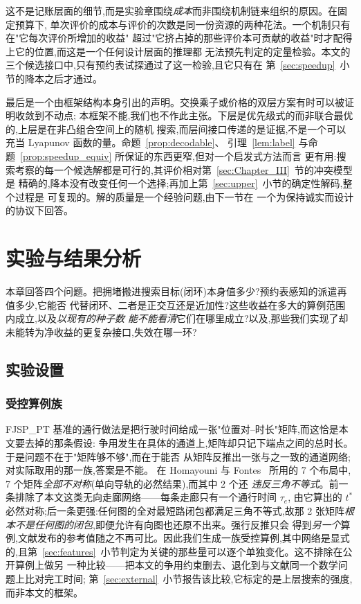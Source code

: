 \documentclass[manuscript,screen,review]{acmart}
\newcommand{\PubNLayout}{7}
\newcommand{\PubNLayoutAsym}{7}           %
\newcommand{\PubNLayoutBad}{2}            %
\begin{document}
这不是记账层面的细节,而是实验章围绕\emph{成本}而非围绕机制链来组织的原因。在固定预算下,
单次评价的成本与评价的次数是同一份资源的两种花法。一个机制只有在"它每次评价所增加的收益"
超过"它挤占掉的那些评价本可贡献的收益"时才配得上它的位置,而这是一个任何设计层面的推理都
无法预先判定的定量检验。本文的三个候选接口中,只有预约表试探通过了这一检验,且它只有在
第~\ref{sec:speedup}~小节的降本之后才通过。

最后是一个由框架结构本身引出的声明。交换乘子或价格的双层方案有时可以被证明收敛到不动点;
本框架不能,我们也不作此主张。下层是优先级式的而非联合最优的,上层是在非凸组合空间上的随机
搜索,而层间接口传递的是证据,不是一个可以充当 Lyapunov 函数的量。命题~\ref{prop:decodable}、
引理~\ref{lem:label} 与命题~\ref{prop:speedup_equiv} 所保证的东西更窄,但对一个启发式方法而言
更有用:搜索考察的每一个候选解都是可行的,其评价相对第~\ref{sec:Chapter_III}~节的冲突模型是
精确的,降本没有改变任何一个选择;再加上第~\ref{sec:upper}~小节的确定性解码,整个过程是
可复现的。解的质量是一个经验问题,由下一节在
一个为保持诚实而设计的协议下回答。

\section{实验与结果分析}
\label{sec:Chapter_V}

本章回答四个问题。把拥堵搬进搜索目标(闭环)本身值多少?预约表感知的派遣再值多少,它能否
代替闭环、二者是正交互还是近加性?这些收益在多大的算例范围内成立,以及\emph{以现有的种子数
能不能看清}它们在哪里成立?以及,那些我们实现了却未能转为净收益的更复杂接口,失效在哪一环?

\subsection{实验设置}
\label{sec:instances}

\subsubsection{受控算例族}
FJSP\_PT 基准的通行做法是把行驶时间给成一张"位置对--时长"矩阵,而这恰是本文要去掉的那条假设:
争用发生在具体的通道上,矩阵却只记下端点之间的总时长。于是问题不在于"矩阵够不够",而在于能否
从矩阵反推出一张与之一致的通道网络;对实际取用的那一族,答案是不能。
在 Homayouni 与 Fontes~\cite{homayouni2021production} 所用的 \PubNLayout{} 个布局中,
\PubNLayoutAsym{} 个矩阵\emph{全部不对称}(单向导轨的必然结果),而其中 \PubNLayoutBad{} 个还
\emph{违反三角不等式}。前一条排除了本文这类无向走廊网络——每条走廊只有一个通行时间 $\tau_e$,
由它算出的 $t^{*}$ 必然对称;后一条更强:任何图的全对最短路闭包都满足三角不等式,故那
\PubNLayoutBad{} 张矩阵\emph{根本不是任何图的闭包},即便允许有向图也还原不出来。强行反推只会
得到\emph{另一个}算例,文献发布的参考值随之不再可比。因此我们生成一族受控算例,其中网络是显式
的,且第~\ref{sec:features}~小节判定为关键的那些量可以逐个单独变化。这不排除在公开算例上做另
一种比较——把本文的争用约束删去、退化到与文献同一个数学问题上比对完工时间;
第~\ref{sec:external}~小节报告该比较,它标定的是上层搜索的强度,而非本文的框架。
\end{document}
